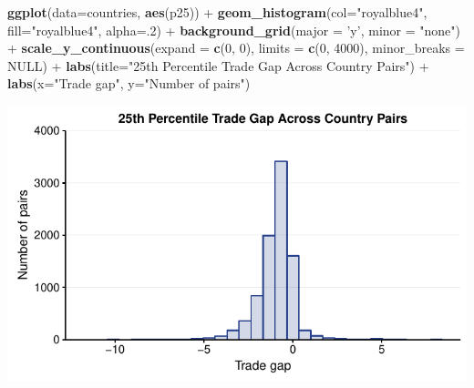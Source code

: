 \documentclass[10pt,]{article}
\newenvironment{Shaded}{\begin{snugshade}}{\end{snugshade}}
\newcommand{\KeywordTok}[1]{\textcolor[rgb]{0.13,0.29,0.53}{\textbf{{#1}}}}
\newcommand{\DataTypeTok}[1]{\textcolor[rgb]{0.13,0.29,0.53}{{#1}}}
\newcommand{\DecValTok}[1]{\textcolor[rgb]{0.00,0.00,0.81}{{#1}}}
\newcommand{\StringTok}[1]{\textcolor[rgb]{0.31,0.60,0.02}{{#1}}}
\newcommand{\OtherTok}[1]{\textcolor[rgb]{0.56,0.35,0.01}{{#1}}}
\newcommand{\NormalTok}[1]{{#1}}
\begin{document}
\begin{Shaded}
\begin{Highlighting}[]
\KeywordTok{ggplot}\NormalTok{(}\DataTypeTok{data=}\NormalTok{countries, }\KeywordTok{aes}\NormalTok{(p25)) +}
\StringTok{  }\KeywordTok{geom_histogram}\NormalTok{(}\DataTypeTok{col=}\StringTok{"royalblue4"}\NormalTok{,}
                 \DataTypeTok{fill=}\StringTok{"royalblue4"}\NormalTok{,}
                 \DataTypeTok{alpha=}\NormalTok{.}\DecValTok{2}\NormalTok{) +}
\StringTok{  }\KeywordTok{background_grid}\NormalTok{(}\DataTypeTok{major =} \StringTok{'y'}\NormalTok{, }\DataTypeTok{minor =} \StringTok{"none"}\NormalTok{) +}
\StringTok{  }\KeywordTok{scale_y_continuous}\NormalTok{(}\DataTypeTok{expand =} \KeywordTok{c}\NormalTok{(}\DecValTok{0}\NormalTok{, }\DecValTok{0}\NormalTok{), }\DataTypeTok{limits =} \KeywordTok{c}\NormalTok{(}\DecValTok{0}\NormalTok{, }\DecValTok{4000}\NormalTok{),  }\DataTypeTok{minor_breaks =} \OtherTok{NULL}\NormalTok{) +}
\StringTok{  }\KeywordTok{labs}\NormalTok{(}\DataTypeTok{title=}\StringTok{"25th Percentile Trade Gap Across Country Pairs"}\NormalTok{) +}
\StringTok{  }\KeywordTok{labs}\NormalTok{(}\DataTypeTok{x=}\StringTok{"Trade gap"}\NormalTok{, }\DataTypeTok{y=}\StringTok{"Number of pairs"}\NormalTok{)}
\end{Highlighting}
\end{Shaded}

\begin{center}\includegraphics{Figs/value_summary-8} \end{center}
\end{document}
